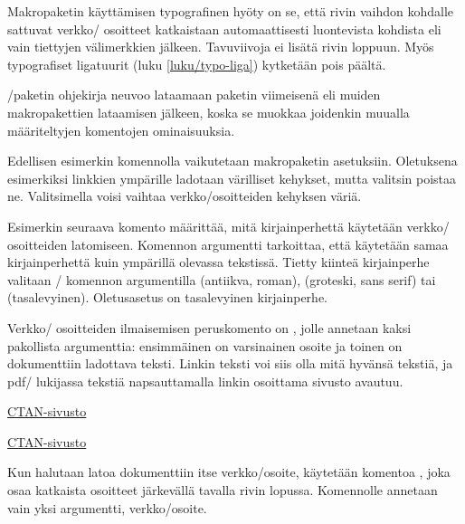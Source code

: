 Makropaketin käyttämisen typografinen hyöty on se, että rivin vaihdon
kohdalle sattuvat verkko\-/ osoitteet katkaistaan automaattisesti
luontevista kohdista eli vain tiettyjen välimerkkien jälkeen.
Tavuviivoja ei lisätä rivin loppuun. Myös typografiset ligatuurit (luku
\ref{luku/typo-liga}) kytketään pois päältä.

\-/paketin ohjekirja neuvoo lataamaan paketin
viimeisenä eli muiden makropakettien lataamisen jälkeen, koska se
muokkaa joidenkin muualla määriteltyjen komentojen ominaisuuksia.

\begin{koodilohkosis}
\usepackage{hyperref}  %
\hypersetup{hidelinks} %
\end{koodilohkosis}

Edellisen esimerkin komennolla  vaikutetaan
makropaketin asetuksiin. Oletuksena esimerkiksi linkkien ympärille
ladotaan värilliset kehykset, mutta valitsin  poistaa
ne. Valitsimella  voisi vaihtaa verkko\-/osoitteiden
kehyksen väriä.

Esimerkin seuraava komento  määrittää, mitä
kirjainperhettä käytetään verkko\-/ osoitteiden latomiseen. Komennon
argumentti  tarkoittaa, että käytetään samaa kirjainperhettä
kuin ympärillä olevassa tekstissä. Tietty kiinteä kirjainperhe valitaan
\-/ komennon argumentilla  (antiikva,
roman),  (groteski, sans serif) tai  (tasalevyinen).
Oletusasetus on tasalevyinen kirjainperhe.

Verkko\-/ osoitteiden ilmaisemisen peruskomento on ,
jolle annetaan kaksi pakollista argumenttia: ensimmäinen on varsinainen
osoite ja toinen on dokumenttiin ladottava teksti. Linkin teksti voi
siis olla mitä hyvänsä tekstiä, ja pdf\-/ lukijassa tekstiä
napsauttamalla linkin osoittama sivusto avautuu.

\begin{koodilohkosis}
\href{https://www.ctan.org/}{CTAN-sivusto}
\end{koodilohkosis}

\begin{tulossis}
  \href{https://www.ctan.org/}{CTAN-sivusto}
\end{tulossis}

Kun halutaan latoa dokumenttiin itse verkko\-/osoite, käytetään komentoa
,  joka osaa katkaista osoitteet
järkevällä tavalla rivin lopussa. Komennolle annetaan vain yksi
argumentti, verkko\-/osoite.

